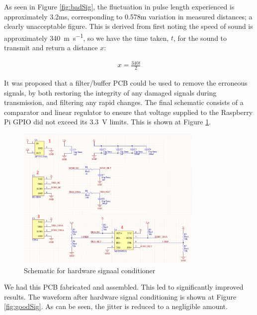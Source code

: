 \documentclass[capstone_report.tex]{subfiles}
\begin{document}
As seen in Figure \ref{fig:badSig}, the fluctuation in pulse length experienced is approximately 3.2ms, corresponding to 0.578m variation in measured distances; a clearly unacceptable figure. This is derived from first noting the speed of sound is approximately \SI{340}{\metre\per\second}, so we have the time taken, $t$, for the sound to transmit and return a distance $x$:

\begin{align*}
	x=\frac{340t}{2}
\end{align*}

It was proposed that a filter/buffer PCB could be used to remove the erroneous signals, by both restoring the integrity of any damaged signals during transmission, and filtering any rapid changes. The final schematic consists of a comparator and linear regulator to ensure that voltage supplied to the Raspberry Pi GPIO did not exceed its \SI{3.3}{\volt} limits. This is shown at Figure \ref{fig:sigSchem}.

    \begin{figure}[H]
        \centering
        \includegraphics[width=0.8\textwidth]{imgs/schematic.png}
        \caption{Schematic for hardware signaal conditioner\label{fig:sigSchem}}
    \end{figure}

We had this PCB fabricated and assembled. This led to significantly improved results. The waveform after hardware signal conditioning is shown at Figure \ref{fig:goodSig}. As can be seen, the jitter is reduced to a negligible amount.
\end{document}
